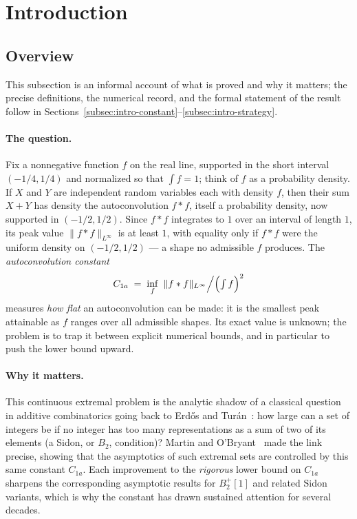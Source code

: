 \documentclass[11pt, letterpaper]{article}
\theoremstyle{paperplain}
\theoremstyle{paperdef}
\newcommand{\Linf}{L^\infty}
\begin{document}
\section{Introduction}\label{sec:intro}

\subsection{Overview}\label{subsec:intro-overview}

This subsection is an informal account of what is proved and why it
matters; the precise definitions, the numerical record, and the formal
statement of the result follow in
Sections~\ref{subsec:intro-constant}--\ref{subsec:intro-strategy}.

\paragraph{The question.}
Fix a nonnegative function $f$ on the real line, supported in the short
interval $(-1/4,1/4)$ and normalized so that $\int f=1$; think of $f$
as a probability density.  If $X$ and $Y$ are independent random
variables each with density $f$, then their sum $X+Y$ has density the
autoconvolution $f*f$, itself a probability density, now supported in
$(-1/2,1/2)$.  Since $f*f$ integrates to $1$ over an interval of
length $1$, its peak value $\|f*f\|_{\Linf}$ is at least $1$, with
equality only if $f*f$ were the uniform density on $(-1/2,1/2)$ --- a
shape no admissible $f$ produces.  The \emph{autoconvolution constant}
\[
  C_{1a}
  \;=\;
  \inf_{f}\ \|f*f\|_{\Linf}\Big/\Bigl(\textstyle\int f\Bigr)^{2}
\]
measures \emph{how flat} an autoconvolution can be made: it is the
smallest peak attainable as $f$ ranges over all admissible shapes.
Its exact value is unknown; the problem is to trap it between explicit
numerical bounds, and in particular to push the lower bound upward.

\paragraph{Why it matters.}
This continuous extremal problem is the analytic shadow of a classical
question in additive combinatorics going back to Erd\H{o}s and
Tur\'an~\cite{ET41}: how large can a set of integers be if no integer
has too many representations as a sum of two of its elements (a Sidon,
or $B_2$, condition)?  Martin and O'Bryant~\cite{MO2009} made the link
precise, showing that the asymptotics of such extremal sets are
controlled by this same constant $C_{1a}$.  Each improvement to the
\emph{rigorous} lower bound on $C_{1a}$ sharpens the corresponding
asymptotic results for $B_2^{+}[1]$ and related Sidon variants, which
is why the constant has drawn sustained attention for several decades.
\end{document}
